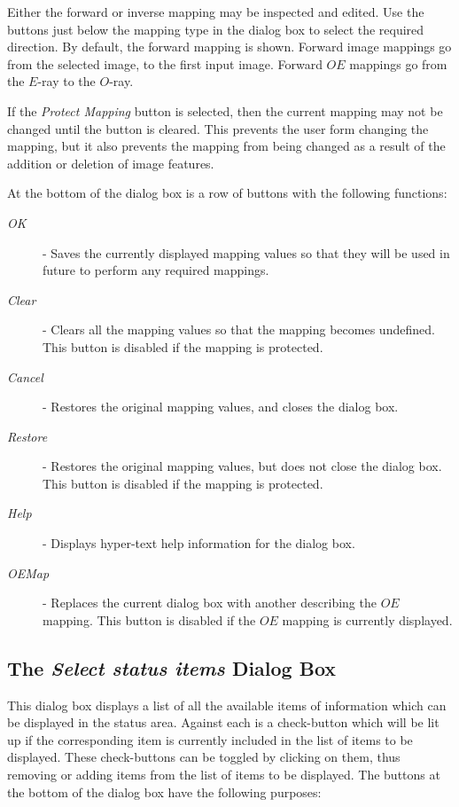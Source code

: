 \documentclass[11pt]{article}
\newcommand{\htmlref}[2]{#1}
\newcommand{\xlabel}[1]{}
\newcommand{\mylabel}[1] {\xlabel{#1}\label{#1}}
\begin{document}
Either the forward or inverse mapping may be inspected and edited. Use
the buttons just below the mapping type in the dialog box to select the
required direction. By default, the forward mapping is shown. Forward
image mappings go from the selected image, to the first input image.
Forward $OE$ mappings go from the $E$-ray to the $O$-ray.

If the \emph{Protect Mapping} button is selected, then the current mapping
may not be changed until the button is cleared. This prevents the user
form changing the mapping, but it also prevents the mapping from being
changed as a result of the addition or deletion of image features.

At the bottom of the dialog box is a row of buttons with the following
functions:

\begin{description}
\item [\emph{OK}] - Saves the currently displayed mapping values so that
they will be used in future to perform any required mappings.
\item [\emph{Clear}] - Clears all the mapping values so that the mapping
becomes undefined. This button is disabled if the mapping is protected.
\item [\emph{Cancel}] - Restores the original mapping values, and closes
the dialog box.
\item [\emph{Restore}] - Restores the original mapping values, but does not
close the dialog box. This button is disabled if the mapping is protected.
\item [\emph{Help}] - Displays hyper-text help information for the dialog
box.
\item [\emph{OEMap}] - Replaces the current dialog box with another
describing the $OE$ mapping. This button is disabled if the $OE$ mapping
is currently displayed.
\end{description}

\subsection {\mylabel{POLKA_STATUS_ITEMS_DIALOG}The \emph{Select status items} Dialog Box}
This dialog box displays a list of all the available items of information
which can be displayed in the \htmlref{status area}{POLKA_STATUS_AREA}.
Against each is a check-button which will be lit up if the corresponding
item is currently included in the list of items to be displayed. These
check-buttons can be toggled by clicking on them, thus removing or adding
items from the list of items to be displayed. The buttons at the bottom
of the dialog box have the following purposes:
\end{document}
